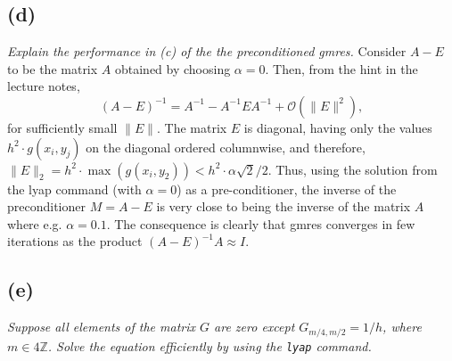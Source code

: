 \subsection*{(d)}
\emph{Explain the performance in (c) of the the preconditioned gmres. 
}
Consider $A-E$ to be the matrix $A$ obtained by choosing $\alpha = 0$. Then, from the hint in the lecture notes, 
\begin{equation}
(A-E)^{-1} = A^{-1}-A^{-1}EA^{-1}+\mathcal O(\|E\|^2),
\end{equation}
for sufficiently small $\|E\|$. The matrix $E$ is diagonal, having only the values $h^2\cdot g(x_i,y_j)$ on the diagonal ordered columnwise, and therefore, $\|E\|_2 = h^2\cdot \max(g(x_i,y_2))<h^2\cdot\alpha \sqrt{2}/2$. Thus, using the solution from the lyap command (with $\alpha = 0$) as a pre-conditioner, the inverse of the preconditioner $M=A-E$ is very close to being the inverse of the matrix $A$ where e.g. $\alpha = 0.1$. The consequence is clearly that gmres converges in few iterations as the product $(A-E)^{-1}A\approx I$. 

\subsection*{(e)}
\emph{Suppose all elements of the matrix $G$ are zero except $G_{m/4,m/2} = 1/h$, where $m\in 4\mathbb Z$. Solve the equation efficiently by using the \texttt{lyap} command.}


